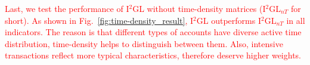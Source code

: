 \textcolor{red}{
Last, we test the performance of I$^2$GL without time-density matrices (I$^2$GL$_{nT}$ for short). As shown in Fig.~\ref{fig:time-density_result}, I$^2$GL outperforms I$^2$GL$_{nT}$ in all indicators. The reason is that different types of accounts have diverse active time distribution, time-density helps to distinguish between them. Also, intensive transactions reflect more typical characteristics, therefore deserve higher weights.
}



